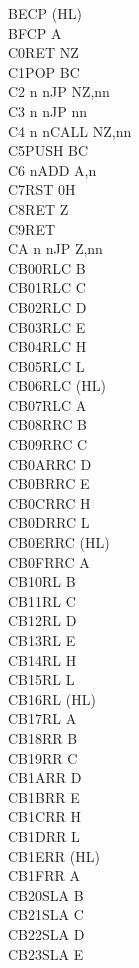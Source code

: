 \documentclass[oneside,a4paper]{book}
\begin{document}
\begin{multicols}{3}
{\begin{tabbing}
BE\>CP (HL)\\
BF\>CP A\\
C0\>RET NZ\\
C1\>POP BC\\
C2 n n\>JP NZ,nn\\
C3 n n\>JP nn\\
C4 n n\>CALL NZ,nn\\
C5\>PUSH BC\\
C6 n\>ADD A,n\\
C7\>RST 0H\\
C8\>RET Z\\
C9\>RET\\
CA n n\>JP Z,nn\\
CB00\>RLC B\\
CB01\>RLC C\\
CB02\>RLC D\\
CB03\>RLC E\\
CB04\>RLC H\\
CB05\>RLC L\\
CB06\>RLC (HL)\\
CB07\>RLC A\\
CB08\>RRC B\\
CB09\>RRC C\\
CB0A\>RRC D\\
CB0B\>RRC E\\
CB0C\>RRC H\\
CB0D\>RRC L\\
CB0E\>RRC (HL)\\
CB0F\>RRC A\\
CB10\>RL B\\
CB11\>RL C\\
CB12\>RL D\\
CB13\>RL E\\
CB14\>RL H\\
CB15\>RL L\\
CB16\>RL (HL)\\
CB17\>RL A\\
CB18\>RR B\\
CB19\>RR C\\
CB1A\>RR D\\
CB1B\>RR E\\
CB1C\>RR H\\
CB1D\>RR L\\
CB1E\>RR (HL)\\
CB1F\>RR A\\
CB20\>SLA B\\
CB21\>SLA C\\
CB22\>SLA D\\
CB23\>SLA E\\

\end{tabbing}}
\end{multicols}
\end{document}
